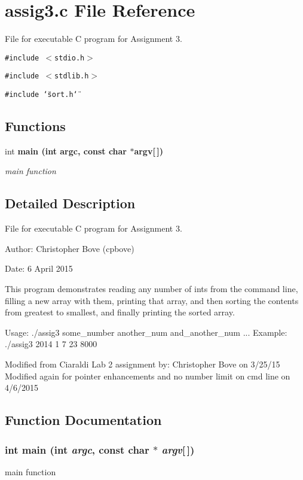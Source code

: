 \section{assig3.c File Reference}
\label{assig3_8c}
File for executable C program for Assignment 3. 

{\tt \#include $<$stdio.h$>$}\par
{\tt \#include $<$stdlib.h$>$}\par
{\tt \#include \char`\"{}sort.h\char`\"{}}\par
\subsection*{Functions}
\begin{CompactItemize}
\item 
int \bf{main} (int argc, const char $\ast$argv[$\,$])
\begin{CompactList}\small\item\em main function \item\end{CompactList}\end{CompactItemize}


\subsection{Detailed Description}
File for executable C program for Assignment 3. 

\begin{Desc}
\item[Author:]Christopher Bove (cpbove) \end{Desc}
\begin{Desc}
\item[Date:]6 April 2015\end{Desc}
This program demonstrates reading any number of ints from the command line, filling a new array with them, printing that array, and then sorting the contents from greatest to smallest, and finally printing the sorted array.

Usage: ./assig3 some\_\-number another\_\-num and\_\-another\_\-num ... Example: ./assig3 2014 1 7 23 8000

Modified from Ciaraldi Lab 2 assignment by: Christopher Bove on 3/25/15 Modified again for pointer enhancements and no number limit on cmd line on 4/6/2015 

\subsection{Function Documentation}
\subsubsection{\setlength{\rightskip}{0pt plus 5cm}int main (int {\em argc}, const char $\ast$ {\em argv}[$\,$])}\label{assig3_8c_c0f2228420376f4db7e1274f2b41667c}


main function 

